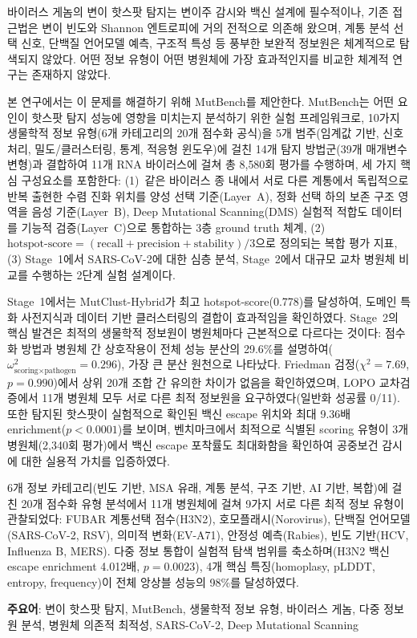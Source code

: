 \begin{sloppypar}
바이러스 게놈의 변이 핫스팟 탐지는 변이주 감시와 백신 설계에 필수적이나, 기존 접근법은 변이 빈도와 Shannon 엔트로피에 거의 전적으로 의존해 왔으며, 계통 분석 선택 신호, 단백질 언어모델 예측, 구조적 특성 등 풍부한 보완적 정보원은 체계적으로 탐색되지 않았다. 어떤 정보 유형이 어떤 병원체에 가장 효과적인지를 비교한 체계적 연구는 존재하지 않았다.

본 연구에서는 이 문제를 해결하기 위해 MutBench를 제안한다.
MutBench는 어떤 요인이 핫스팟 탐지 성능에 영향을 미치는지 분석하기 위한 실험 프레임워크로, 10가지 생물학적 정보 유형(6개 카테고리의 20개 점수화 공식)을 5개 범주(임계값 기반, 신호처리, 밀도/클러스터링, 통계, 적응형 윈도우)에 걸친 14개 탐지 방법군(39개 매개변수 변형)과 결합하여 11개 RNA 바이러스에 걸쳐 총 8{,}580회 평가를 수행하며, 세 가지 핵심 구성요소를 포함한다:
(1)~같은 바이러스 종 내에서 서로 다른 계통에서 독립적으로 반복 출현한 수렴 진화 위치를 양성 선택 기준(Layer~A),
정화 선택 하의 보존 구조 영역을 음성 기준(Layer~B),
Deep Mutational Scanning(DMS) 실험적 적합도 데이터를
기능적 검증(Layer~C)으로 통합하는 3층 ground truth 체계,
(2) $\text{hotspot-score} = (\text{recall} + \text{precision} + \text{stability}) / 3$으로 정의되는 복합 평가 지표,
(3) Stage~1에서 SARS-CoV-2에 대한 심층 분석, Stage~2에서 대규모 교차 병원체 비교를 수행하는 2단계 실험 설계이다.

Stage~1에서는 MutClust-Hybrid가 최고 hotspot-score(0.778)를 달성하여,
도메인 특화 사전지식과 데이터 기반 클러스터링의 결합이 효과적임을 확인하였다.
Stage~2의 핵심 발견은 최적의 생물학적 정보원이 병원체마다 근본적으로 다르다는 것이다: 점수화 방법과 병원체 간 상호작용이 전체 성능 분산의 29.6\%를 설명하여($\omega^2_{\text{scoring} \times \text{pathogen}} = 0.296$), 가장 큰 분산 원천으로 나타났다.
Friedman 검정($\chi^2 = 7.69$, $p = 0.990$)에서 상위 20개 조합 간 유의한 차이가 없음을 확인하였으며, LOPO 교차검증에서 11개 병원체 모두 서로 다른 최적 정보원을 요구하였다(일반화 성공률 0/11).
또한 탐지된 핫스팟이 실험적으로 확인된 백신 escape 위치와 최대 9.36배 enrichment($p < 0.0001$)를 보이며, 벤치마크에서 최적으로 식별된 scoring 유형이 3개 병원체(2{,}340회 평가)에서 백신 escape 포착률도 최대화함을 확인하여 공중보건 감시에 대한 실용적 가치를 입증하였다.

6개 정보 카테고리(빈도 기반, MSA 유래, 계통 분석, 구조 기반, AI 기반, 복합)에 걸친 20개 점수화 유형 분석에서 11개 병원체에 걸쳐 9가지 서로 다른 최적 정보 유형이 관찰되었다: FUBAR 계통선택 점수(H3N2), 호모플래시(Norovirus), 단백질 언어모델(SARS-CoV-2, RSV), 의미적 변화(EV-A71), 안정성 예측(Rabies), 빈도 기반(HCV, Influenza B, MERS).
다중 정보 통합이 실험적 탐색 범위를 축소하며(H3N2 백신 escape enrichment 4.012배, $p = 0.0023$), 4개 핵심 특징(homoplasy, pLDDT, entropy, frequency)이 전체 앙상블 성능의 98\%를 달성하였다.

\vspace{1em}
\end{sloppypar}
\noindent\textbf{주요어}: 변이 핫스팟 탐지, MutBench, 생물학적 정보 유형, 바이러스 게놈, 다중 정보원 분석, 병원체 의존적 최적성, SARS-CoV-2, Deep Mutational Scanning
